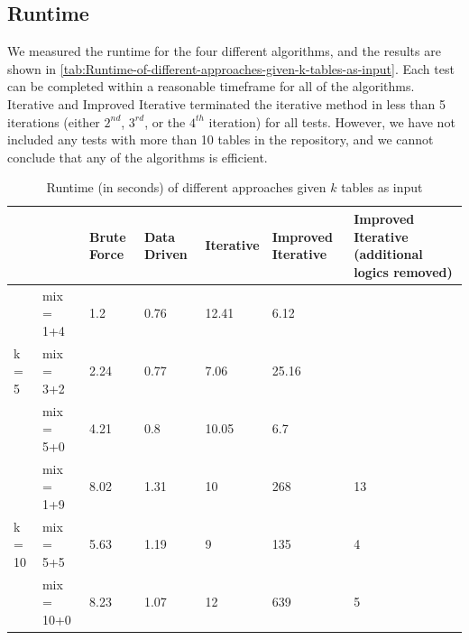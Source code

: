 \subsection{Runtime}
We measured the runtime for the four different algorithms, and the results are shown in \autoref{tab:Runtime-of-different-approaches-given-k-tables-as-input}. Each test can be completed within a reasonable timeframe for all of the algorithms. Iterative and Improved Iterative terminated the iterative method in less than 5 iterations (either $2^{nd}$, $3^{rd}$, or the $4^{th}$ iteration) for all tests. However, we have not included any tests with more than 10 tables in the repository, and we cannot conclude that any of the algorithms is efficient.

\begin{table}[h!]
    \centering
    \scriptsize
    \begin{center}
      \caption{Runtime (in seconds) of different approaches given $k$ tables as input}
      \label{tab:Runtime-of-different-approaches-given-k-tables-as-input}
      \begin{tabular}{|p{}|p{}|p{}|p{}|p{}|p{}|p{}|}  
        \hline
         & & \textbf{Brute Force} & \textbf{Data Driven} & \textbf{Iterative} & \textbf{Improved Iterative} & \textbf{Improved Iterative (additional logics removed)}\\
        \hline
        \multirow{3}{*}{k = 5} & mix = 1+4 & 1.2 & 0.76 & 12.41 & 6.12 & \\
        \cline{2-7}
        & mix = 3+2 & 2.24 & 0.77 & 7.06 & 25.16 & \\
        \cline{2-7}
        & mix = 5+0 & 4.21 & 0.8 & 10.05 & 6.7 & \\
        \hline        
        \multirow{3}{*}{k = 10} & mix = 1+9 & 8.02 & 1.31 & 10 & 268 & 13 \\
        \cline{2-7}
        & mix = 5+5 & 5.63 & 1.19 & 9 & 135 & 4 \\
        \cline{2-7}
        & mix = 10+0 & 8.23 & 1.07 & 12 & 639 & 5 \\
        \hline
      \end{tabular}
    \end{center}
\end{table}


